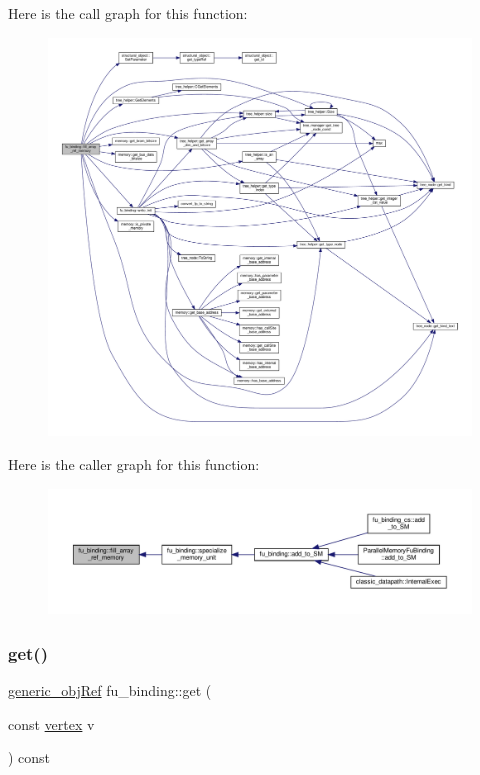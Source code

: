 Here is the call graph for this function\+:
\nopagebreak
\begin{figure}[H]
\begin{center}
\leavevmode
\includegraphics[width=350pt]{d8/d04/classfu__binding_ac16197a1e3dd209aee9a4f35b1654d6c_cgraph}
\end{center}
\end{figure}
Here is the caller graph for this function\+:
\nopagebreak
\begin{figure}[H]
\begin{center}
\leavevmode
\includegraphics[width=350pt]{d8/d04/classfu__binding_ac16197a1e3dd209aee9a4f35b1654d6c_icgraph}
\end{center}
\end{figure}
\mbox{\label{classfu__binding_afbc918cf6838696e8c4f0373ccac09ac}} 
\subsubsection{\texorpdfstring{get()}{get()}\hspace{0.1cm}{\footnotesize\ttfamily [1/2]}}
{\footnotesize\ttfamily \hyperlink{generic__obj_8hpp_acb533b2ef8e0fe72e09a04d20904ca81}{generic\+\_\+obj\+Ref} fu\+\_\+binding\+::get (\begin{DoxyParamCaption}\item[{const \hyperlink{graph_8hpp_abefdcf0544e601805af44eca032cca14}{vertex}}]{v }\end{DoxyParamCaption}) const}



